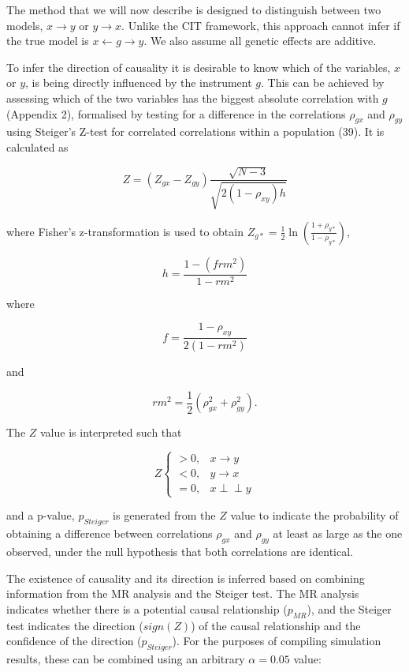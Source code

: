 \documentclass[]{article}
\begin{document}
The method that we will now describe is designed to distinguish between
two models, \(x \rightarrow y\) or \(y \rightarrow x\). Unlike the CIT
framework, this approach cannot infer if the true model is
\(x \leftarrow g \rightarrow y\). We also assume all genetic effects are
additive.

To infer the direction of causality it is desirable to know which of the
variables, \(x\) or \(y\), is being directly influenced by the
instrument \(g\). This can be achieved by assessing which of the two
variables has the biggest absolute correlation with \(g\) (Appendix 2),
formalised by testing for a difference in the correlations \(\rho_{gx}\)
and \(\rho_{gy}\) using Steiger's Z-test for correlated correlations
within a population (39). It is calculated as

\[
Z = (Z_{gx} - Z_{gy}) \frac{\sqrt{N-3}}{\sqrt{2(1-\rho_{xy})h}}
\]

where Fisher's z-transformation is used to obtain
\(Z_{g*} = \frac{1}{2} \ln \left ( \frac{1+\rho_{g*}}{1-\rho_{g*}} \right )\),

\[
h = \frac{1 - (frm^2)} {1 - rm^2}
\]

where

\[
f = \frac{1 - \rho_{xy}}{2(1 - rm^2)}
\]

and

\[
rm^2 = \frac{1}{2}(\rho_{gx}^2 + \rho_{gy}^2).
\]

The \(Z\) value is interpreted such that

\[
Z \left\{
\begin{array}{ll}
> 0, & x \to y\\
< 0, & y \to x\\
= 0, & x \perp\!\!\!\perp y 
\end{array} \right.
\]

and a p-value, \(p_{Steiger}\) is generated from the \(Z\) value to
indicate the probability of obtaining a difference between correlations
\(\rho_{gx}\) and \(\rho_{gy}\) at least as large as the one observed,
under the null hypothesis that both correlations are identical.

The existence of causality and its direction is inferred based on
combining information from the MR analysis and the Steiger test. The MR
analysis indicates whether there is a potential causal relationship
(\(p_{MR}\)), and the Steiger test indicates the direction (\(sign(Z)\))
of the causal relationship and the confidence of the direction
(\(p_{Steiger}\)). For the purposes of compiling simulation results,
these can be combined using an arbitrary \(\alpha = 0.05\) value:
\end{document}
